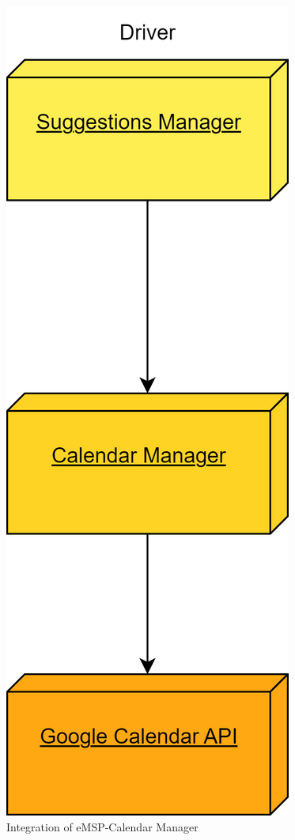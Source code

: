 \documentclass[table, 12pt]{article}
\begin{document}
\begin{figure}[H]
    \includegraphics[scale=0.6, center]{assets/Integration Diagrams/eMSP-Calendar Manager.png}
    \caption{Integration of eMSP-Calendar Manager}
    \label{fig:eMSP-Calendar Manager}
\end{figure}
\end{document}

